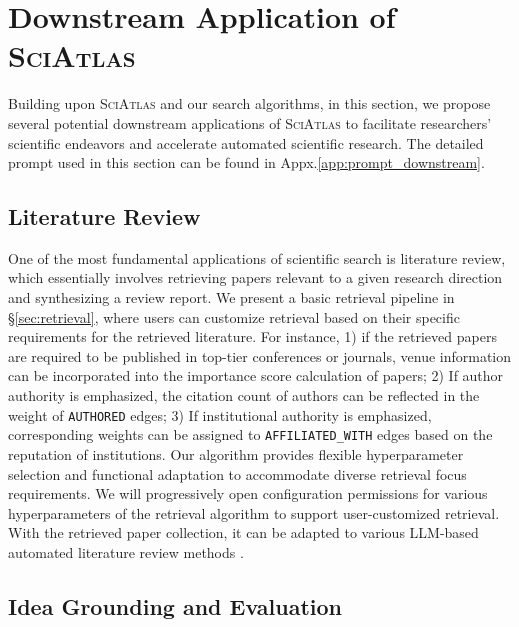 \documentclass{llmxive}
\providecommand{\ours}{\textsc{SciAtlas}}
\begin{document}
\section{Downstream Application of {\ours}}
\label{sec:application}
Building upon {\ours} and our search algorithms, in this section, we propose several potential downstream applications of {\ours} to facilitate researchers' scientific endeavors and accelerate automated scientific research. The detailed prompt used in this section can be found in Appx.\ref{app:prompt_downstream}.

\subsection{Literature Review}
One of the most fundamental applications of scientific search is literature review, which essentially involves retrieving papers relevant to a given research direction and synthesizing a review report.
We present a basic retrieval pipeline in \S\ref{sec:retrieval}, where users can customize retrieval based on their specific requirements for the retrieved literature.
For instance, 1) if the retrieved papers are required to be published in top-tier conferences or journals, venue information can be incorporated into the importance score calculation of papers;
2) If author authority is emphasized, the citation count of authors can be reflected in the weight of \texttt{AUTHORED} edges;
3) If institutional authority is emphasized, corresponding weights can be assigned to \texttt{AFFILIATED\_WITH} edges based on the reputation of institutions.
Our algorithm provides flexible hyperparameter selection and functional adaptation to accommodate diverse retrieval focus requirements.
We will progressively open configuration permissions for various hyperparameters of the retrieval algorithm to support user-customized retrieval.
With the retrieved paper collection, it can be adapted to various LLM-based automated literature review methods \citep{autosurvey,deepreview,surveyforge,surveyx}.

\subsection{Idea Grounding and Evaluation}
\end{document}
